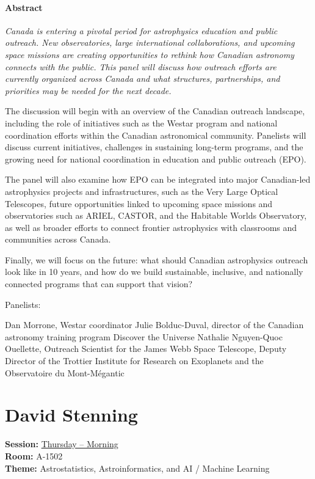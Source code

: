 \paragraph{Abstract}
{\itshape
Canada is entering a pivotal period for astrophysics education and public outreach. New observatories, large international collaborations, and upcoming space missions are creating opportunities to rethink how Canadian astronomy connects with the public. This panel will discuss how outreach efforts are currently organized across Canada and what structures, partnerships, and priorities may be needed for the next decade.

The discussion will begin with an overview of the Canadian outreach landscape, including the role of initiatives such as the Westar program and national coordination efforts within the Canadian astronomical community. Panelists will discuss current initiatives, challenges in sustaining long-term programs, and the growing need for national coordination in education and public outreach (EPO).

The panel will also examine how EPO can be integrated into major Canadian-led astrophysics projects and infrastructures, such as the Very Large Optical Telescopes, future opportunities linked to upcoming space missions and observatories such as ARIEL, CASTOR, and the Habitable Worlds Observatory, as well as broader efforts to connect frontier astrophysics with classrooms and communities across Canada.

Finally, we will focus on the future: what should Canadian astrophysics outreach look like in 10 years, and how do we build sustainable, inclusive, and nationally connected programs that can support that vision?

Panelists:

Dan Morrone, Westar coordinator
Julie Bolduc-Duval, director of the Canadian astronomy training program Discover the Universe
Nathalie Nguyen-Quoc Ouellette, Outreach Scientist for the James Webb Space Telescope, Deputy Director of the Trottier Institute for Research on Exoplanets and the Observatoire du Mont-Mégantic
}

\hypertarget{invited-david-stenning}{}
\label{invited-page-david-stenning}
\section{David Stenning}
\textbf{Session:} \hyperlink{schedule-thursday-morning-a-1502}{Thursday -- Morning}\\
\textbf{Room:} A-1502\\
\textbf{Theme:} Astrostatistics, Astroinformatics, and AI / Machine Learning\\

